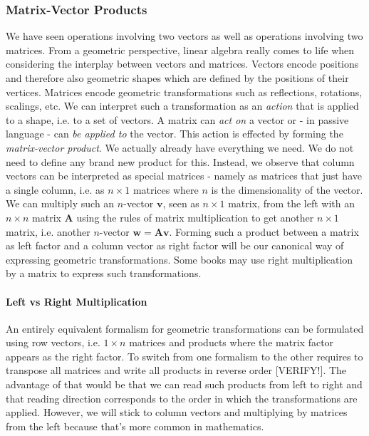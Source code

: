 \subsubsection{Matrix-Vector Products}
We have seen operations involving two vectors as well as operations involving two matrices. From a geometric perspective, linear algebra really comes to life when considering the interplay between vectors and matrices. Vectors encode positions and therefore also geometric shapes which are defined by the positions of their vertices. Matrices encode geometric transformations such as reflections, rotations, scalings, etc. We can interpret such a transformation as an \emph{action} that is applied to a shape, i.e. to a set of vectors. A matrix can \emph{act on} a vector or - in passive language - can \emph{be applied to} the vector. This action is effected by forming the \emph{matrix-vector product}. We actually already have everything we need. We do not need to define any brand new product for this. Instead, we observe that column vectors can be interpreted as special matrices - namely as matrices that just have a single column, i.e. as $n \times 1$ matrices where $n$ is the dimensionality of the vector. We can multiply such an $n$-vector $\mathbf{v}$, seen as $n \times 1$ matrix, from the left with an $n \times n$ matrix  $\mathbf{A}$ using the rules of matrix multiplication to get another $n \times 1$ matrix, i.e. another $n$-vector $\mathbf{w} = \mathbf{A v}$. Forming such a product between a matrix as left factor and a column vector as right factor will be our canonical way of expressing geometric transformations. Some books may use right multiplication by a matrix to express such transformations.


\paragraph{Left vs Right Multiplication}
An entirely equivalent formalism for geometric transformations can be formulated using row vectors, i.e. $1 \times n$ matrices and products where the matrix factor appears as the right factor. To switch from one formalism to the other requires to transpose all matrices and write all products in reverse order [VERIFY!]. The advantage of that would be that we can read such products from left to right and that reading direction corresponds to the order in which the transformations are applied. However, we will stick to column vectors and multiplying by matrices from the left because that's more common in mathematics. 

